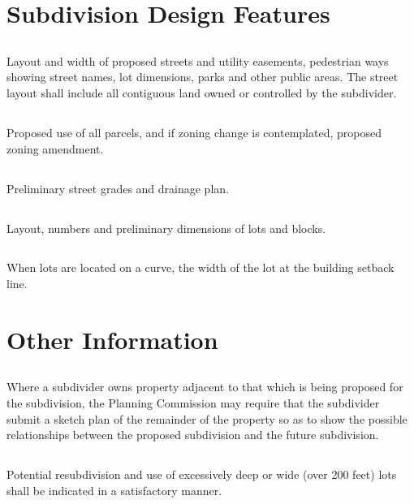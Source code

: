\section{Subdivision Design Features}
\subsection{}
Layout and width of proposed streets and utility easements, pedestrian ways showing street names, lot dimensions, parks and other public areas. The street layout shall include all contiguous land owned or controlled by the subdivider.
\subsection{}
Proposed use of all parcels, and if zoning change is contemplated, proposed zoning amendment.
\subsection{}
Preliminary street grades and drainage plan.
\subsection{}
Layout, numbers and preliminary dimensions of lots and blocks.
\subsection{}
When lots are located on a curve, the width of the lot at the building setback line.

\section{Other Information}
\subsection{}
Where a subdivider owns property adjacent to that which is being proposed for the subdivision, the Planning Commission may require that the subdivider submit a sketch plan of the remainder of the property so as to show the possible relationships between the proposed subdivision and the future subdivision.
\subsection{}
Potential resubdivision and use of excessively deep or wide (over 200 feet) lots shall be indicated in a satisfactory manner.
